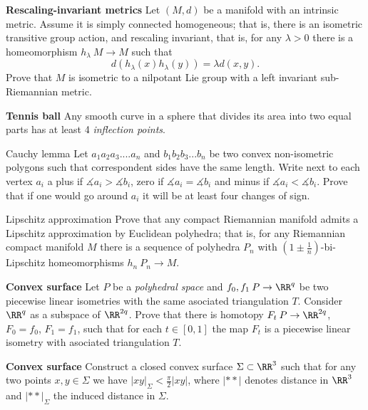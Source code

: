 \begin{pr}
{\bf  Rescaling-invariant metrics} Let $(M,d)$ be a manifold with an intrinsic metric. 
Assume it is simply connected homogeneous; 
that is, there is an isometric transitive group action, and rescaling invariant, 
that is, for any $\lambda>0$ there is a homeomorphism $h_\lambda\:M\to M$ such that $$d(h_\lambda(x)h_\lambda(y))=\lambda d(x,y).$$
Prove that $M$ is isometric to a nilpotant Lie group with a left invariant sub-Riemannian metric.
\end{pr}

\begin{pr}
{\bf  Tennis ball} \cite{arnold}\cite{angenent} Any smooth curve in a sphere that divides its area into two equal parts has at least 4 {\it inflection points}.
\end{pr}

\begin{pr}{\easy}{Cauchy lemma} Let $a_1a_2a_3....a_n$ and $b_1b_2b_3...b_n$ be two convex non-isometric polygons such that correspondent sides have the same length.
Write next to each vertex $a_i$  a plus if $\measuredangle a_i>\measuredangle b_i$, zero if  $\measuredangle a_i=\measuredangle b_i$ and minus if $\measuredangle a_i<\measuredangle b_i$.
Prove that if one would go around $a_i$ it will be at least four changes of sign.
\end{pr}

\begin{pr}{}{Lipschitz approximation}
Prove that any compact Riemannian manifold admits a Lipschitz approximation by Euclidean polyhedra; 
that is, for any Riemannian compact manifold $M$ there is a sequence of polyhedra $P_n$ with $(1\pm\tfrac1n)$-bi-Lipschitz homeomorphisms $h_n\:P_n\to M$.
\end{pr}

\begin{pr}{}
{\bf  Convex surface}
Let $P$ be a \emph{polyhedral space} and $f_0,f_1\:P\to \RR^q$ be two piecewise linear isometries with the same asociated triangulation $T$.
Consider $\RR^q$ as a subspace of $\RR^{2q}$.
Prove that there is homotopy $F_t\:P\to\RR^{2q}$, $F_0=f_0$, $F_1=f_1$, such that for each $t\in[0,1]$ the map $F_t$ is a piecewise linear isometry with asociated triangulation $T$.
\end{pr}

\begin{pr}{}
{\bf  Convex surface}
Construct a closed convex surface $\Sigma\subset \RR^3$ such that for any two points $x,y\in \Sigma$ we have $|x y|_\Sigma< \frac{\pi}{2}|x y|$, where $|**|$ denotes distance in $\RR^3$ and $|**|_\Sigma$ the induced distance in $\Sigma$.
\end{pr}

